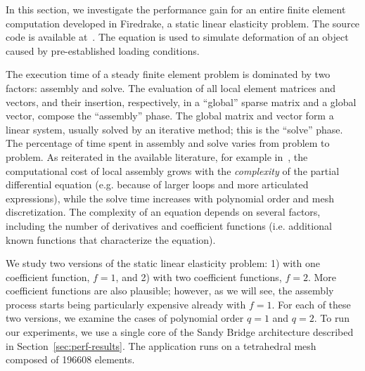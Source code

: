 In this section, we investigate the performance gain for an entire finite element computation developed in Firedrake, a static linear elasticity problem. The source code is available at~\cite{elasticity-code}. The equation is used to simulate deformation of an object caused by pre-established loading conditions.

The execution time of a steady finite element problem is dominated by two factors: assembly and solve. The evaluation of all local element matrices and vectors, and their insertion, respectively, in a ``global'' sparse matrix and a global vector, compose the ``assembly'' phase. The global matrix and vector form a linear system, usually solved by an iterative method; this is the ``solve'' phase. The percentage of time spent in assembly and solve varies from problem to problem. As reiterated in the available literature, for example in~\cite{quadrature1}, the computational cost of local assembly grows with the \textit{complexity} of the partial differential equation (e.g. because of larger loops and more articulated expressions), while the solve time increases with polynomial order and mesh discretization. The complexity of an equation depends on several factors, including the number of derivatives and coefficient functions (i.e. additional known functions that characterize the equation).

We study two versions of the static linear elasticity problem: 1) with one coefficient function, $f=1$, and 2) with two coefficient functions, $f=2$. More coefficient functions are also plausible; however, as we will see, the assembly process starts being particularly expensive already with $f=1$. For each of these two versions, we examine the cases of polynomial order $q=1$ and $q=2$. To run our experiments, we use a single core of the Sandy Bridge architecture described in Section~\ref{sec:perf-results}. The application runs on a tetrahedral mesh composed of 196608 elements.


